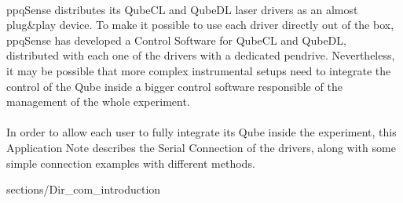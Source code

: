 \documentclass[a4paper,12pt,english]{article}
\begin{document}
 
		
	
	\newpage

    \paragraph{}ppqSense distributes its QubeCL and QubeDL laser drivers as an almost plug\&play device. To make it possible to use each driver directly out of the box, ppqSense has developed a Control Software for QubeCL and QubeDL, distributed with each one of the drivers with a dedicated pendrive.
    \newline Nevertheless, it may be possible that more complex instrumental setups need to integrate the control of the Qube inside a bigger control software responsible of the management of the whole experiment.

    \paragraph{}In order to allow each user to fully integrate its Qube inside the experiment, this Application Note describes the Serial Connection of the drivers, along with some simple connection examples with different methods.
    
	\tableofcontents
	\listoftables
    \listoffigures      
	\newpage
    

     {sections/Dir_com_introduction}
    \newpage
    
	
    \newpage
    
    
    \newpage
    
    \begin{versionhistory}
    \end{versionhistory}
\end{document}

